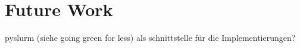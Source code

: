 \chapter{Future Work}

pyslurm (siehe going green for less) als schnittstelle für die Implementierungen?